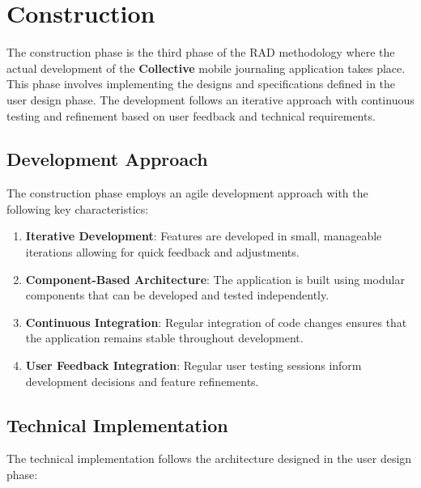 \section{Construction}\label{sec:construction}

The construction phase is the third phase of the RAD methodology where the actual development of the \textbf{Collective} mobile journaling application takes place. This phase involves implementing the designs and specifications defined in the user design phase. The development follows an iterative approach with continuous testing and refinement based on user feedback and technical requirements.

\subsection{Development Approach}\label{subsec:developmentApproach}

The construction phase employs an agile development approach with the following key characteristics:

\begin{enumerate}
    \item \textbf{Iterative Development}: Features are developed in small, manageable iterations allowing for quick feedback and adjustments.
    
    \item \textbf{Component-Based Architecture}: The application is built using modular components that can be developed and tested independently.
    
    \item \textbf{Continuous Integration}: Regular integration of code changes ensures that the application remains stable throughout development.
    
    \item \textbf{User Feedback Integration}: Regular user testing sessions inform development decisions and feature refinements.
\end{enumerate}

\subsection{Technical Implementation}\label{subsec:technicalImplementation}

The technical implementation follows the architecture designed in the user design phase:

